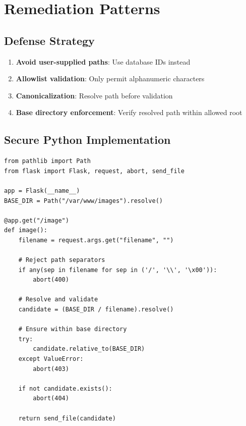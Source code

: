 \documentclass[11pt,letterpaper]{article}
\begin{document}
\section{Remediation Patterns}

\subsection{Defense Strategy}

\begin{enumerate}
  \item \textbf{Avoid user-supplied paths}: Use database IDs instead
  \item \textbf{Allowlist validation}: Only permit alphanumeric characters
  \item \textbf{Canonicalization}: Resolve path before validation
  \item \textbf{Base directory enforcement}: Verify resolved path within allowed root
\end{enumerate}

\subsection{Secure Python Implementation}

\begin{listing}[H]
\begin{verbatim}
from pathlib import Path
from flask import Flask, request, abort, send_file

app = Flask(__name__)
BASE_DIR = Path("/var/www/images").resolve()

@app.get("/image")
def image():
    filename = request.args.get("filename", "")

    # Reject path separators
    if any(sep in filename for sep in ('/', '\\', '\x00')):
        abort(400)

    # Resolve and validate
    candidate = (BASE_DIR / filename).resolve()

    # Ensure within base directory
    try:
        candidate.relative_to(BASE_DIR)
    except ValueError:
        abort(403)

    if not candidate.exists():
        abort(404)

    return send_file(candidate)
\end{verbatim}
\caption{Python: Secure file serving with pathlib}
\end{listing}
\end{document}
